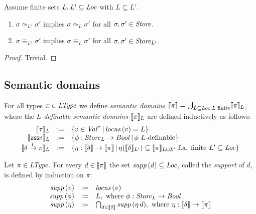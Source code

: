 \documentclass[12pt,a4paper]{report}
\begin{document}
\begin{lemma}
  Assume finite sets $L,L'\subseteq\mathit{Loc}$ with $L \subseteq L'$.
  \begin{enumerate}
    \item $\sigma \simeq_{L'} \sigma'$ implies $\sigma \simeq_L \sigma'$ for all $\sigma,\sigma'\in\mathit{Store}$.
    \item $\sigma \equiv_{L'} \sigma'$ implies $\sigma \equiv_L \sigma'$ for all $\sigma,\sigma'\in\mathit{Store}_{L'}$.
  \end{enumerate}
\end{lemma}

\begin{proof}
  Trivial.
\end{proof}



\subsection{Semantic domains}

\begin{definition}
  For all types $\pi \in \mathit{LType}$ we define {\em semantic domains}
  $\llbracket\pi\rrbracket = \bigcup_{L\subseteq\mathit{Loc},L\text{ finite}} \llbracket\pi\rrbracket_L$, where
  the {\em $L$-definable semantic domains} $\llbracket\pi\rrbracket_L$ are defined inductively as follows:
  \[\begin{array}{rcl}
    \llbracket\tau\rrbracket_L &:=& \{v\in\mathit{Val}^\tau\,|\,\mathit{locns}\,(v)=L\} \\
    \llbracket\mathsf{assn}\rrbracket_L &:=& \{\phi:\mathit{Store}_L \to \mathit{Bool}\,|\,\text{$\phi$ $L$-definable}\} \\
    \llbracket\delta\xrightarrow{t}\pi\rrbracket_L &:=& \{\eta:\llbracket\delta\rrbracket\to\llbracket\pi\rrbracket\,|\,
             \eta(\llbracket\delta\rrbracket_{L'}) \subseteq \llbracket\pi\rrbracket_{L \cup L'} \text{ f.a. finite } L' \subseteq \mathit{Loc}\}
  \end{array}\]
\end{definition}

\begin{definition}[Support]
  Let $\pi\in\mathit{LType}$. For every $d \in \llbracket\pi\rrbracket$ the set $\mathit{supp}\,(d)\subseteq\mathit{Loc}$,
  called the {\em support} of $d$, is defined by induction on $\pi$:
  \[\begin{array}{rcl}
    \mathit{supp}\,(v) &:=& \mathit{locns}\,(v) \\
    \mathit{supp}\,(\phi) &:=& L, \text{ where } \phi:\mathit{Store}_L\to\mathit{Bool} \\
    \mathit{supp}\,(\eta) &:=& \bigcap_{d\in\llbracket\delta\rrbracket} \mathit{supp}\,(\eta\,d), \text{ where } \eta:\llbracket\delta\rrbracket\to\llbracket\pi\rrbracket
  \end{array}\]
\end{definition}
\end{document}
